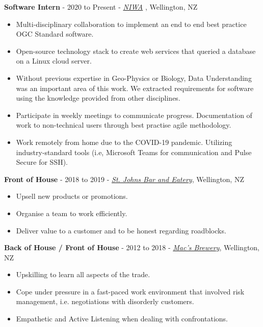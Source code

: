 \documentclass[9pt]{developercv}
\begin{document}
\textbf{Software Intern} - 2020 to Present - \emph{\href{https://niwa.co.nz/}{NIWA}} , Wellington, NZ
\begin{itemize}
    \item Multi-disciplinary collaboration to implement an end to end best practice OGC Standard software.
    \item Open-source technology stack to create web services that queried a database on a Linux cloud server.
    \item Without previous expertise in Geo-Physics or Biology, Data Understanding was an important area of this work. We extracted requirements for software using the knowledge provided from other disciplines.
    \item Participate in weekly meetings to communicate progress. Documentation of work to non-technical users through best practise agile methodology.
    \item Work remotely from home due to the COVID-19 pandemic. Utilizing industry-standard tools (i.e, Microsoft Teams for communication and Pulse Secure for SSH).
\end{itemize}

\textbf{Front of House} - 2018 to 2019 - \emph{\href{https://stjohnsbar.co.nz/}{St. Johns Bar and Eatery}}, Wellington, NZ
\begin{itemize}
    \item Upsell new products or promotions.
    \item Organise a team to work efficiently.
    \item Deliver value to a customer and to be honest regarding roadblocks.
\end{itemize}

\textbf{Back of House / Front of House} - 2012 to 2018 - \emph{\href{https://macsbrewbar.co.nz/}{Mac's Brewery}}, Wellington, NZ
\begin{itemize}
    \item Upskilling to learn all aspects of the trade.
    \item Cope under pressure in a fast-paced work environment that involved risk management, i.e. negotiations with disorderly customers.
    \item Empathetic and Active Listening when dealing with confrontations.
\end{itemize}

\end{document}
